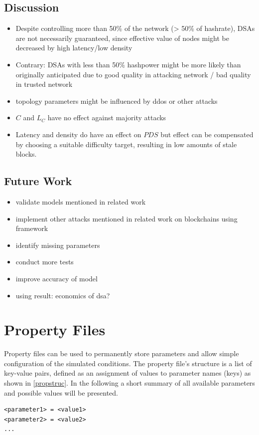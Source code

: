 \documentclass[a4paper,12pt,twoside]{report}
\begin{document}
\section{Discussion}
\begin{itemize}
\item Despite controlling more than 50\% of the network (> 50\% of hashrate), DSAs are not necessarily guaranteed, since effective value of nodes might be decreased by high latency/low density
\item Contrary: DSAs with less than 50\% hashpower might be more likely than originally anticipated due to good quality in attacking network / bad quality in trusted network
\item topology parameters might be influenced by ddos or other attacks
\item $C$ and $L_C$ have no effect against majority attacks
\item Latency and density do have an effect on $PDS$ but effect can be compensated by choosing a suitable difficulty target, resulting in low amounts of stale blocks.
\end{itemize}
\section{Future Work}
\begin{itemize}
\item validate models mentioned in related work
\item implement other attacks mentioned in related work on blockchains using framework
\item identify missing parameters
\item conduct more tests
\item improve accuracy of model
\item using result: economics of dsa?
\end{itemize}




\appendix

\chapter{Property Files} \label{prop}
Property files can be used to permanently store parameters and allow simple configuration of the simulated conditions. The property file's structure is a list of key-value pairs, defined as an assignment of values to parameter names (keys) as shown in \autoref{propstruc}. In the following a short summary of all available parameters and possible values will be presented.
\begin{lstlisting}[caption=Property file structure,label=propstruc]
<parameter1> = <value1>
<parameter2> = <value2>
...
\end{lstlisting}
\end{document}
